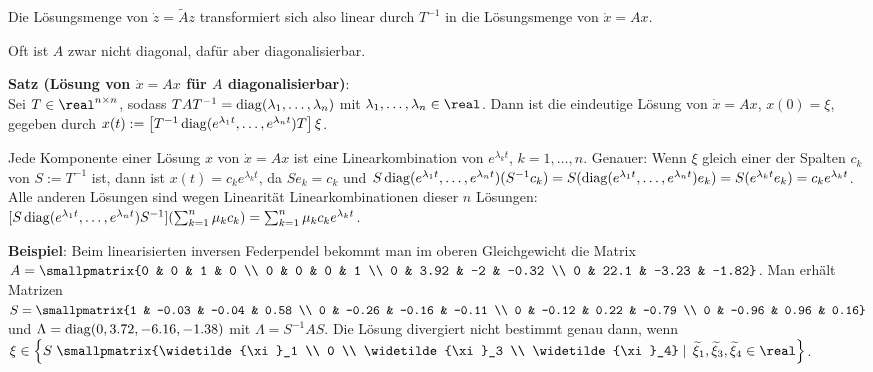 Die Lösungsmenge von $\dot{z} = \widetilde{A} z$ transformiert sich also linear durch $T^{-1}$
in die Lösungsmenge von $\dot{x} = Ax$.

\linie

Oft ist $A$ zwar nicht diagonal, dafür aber diagonalisierbar.

\textbf{Satz (Lösung von $\dot{x} = Ax$ für $A$ diagonalisierbar)}:\\
Sei $T \in \real^{n \times n}$, sodass
$TAT^{-1} = \operatorname{diag}(\lambda_1, \dotsc, \lambda_n)$
mit $\lambda_1, \dotsc, \lambda_n \in \real$.
Dann ist die eindeutige Lösung von $\dot{x} = Ax$, $x(0) = \xi$, gegeben durch
$x(t) := \left[T^{-1} \operatorname{diag}(e^{\lambda_1 t}, \dotsc, e^{\lambda_n t}) T\right] \xi$.

Jede Komponente einer Lösung $x$ von $\dot{x} = Ax$ ist eine
Linearkombination von $e^{\lambda_k t}$, $k = 1, \dotsc, n$.
Genauer: Wenn $\xi$ gleich einer der Spalten $c_k$ von $S := T^{-1}$ ist,
dann ist $x(t) = c_k e^{\lambda_k t}$,
da
$Se_k = c_k$ und
$S \operatorname{diag}(e^{\lambda_1 t}, \dotsc, e^{\lambda_n t}) (S^{-1} c_k) =
S (\operatorname{diag}(e^{\lambda_1 t}, \dotsc, e^{\lambda_n t}) e_k) = S (e^{\lambda_k t} e_k) =
c_k e^{\lambda_k t}$.\\
Alle anderen Lösungen sind wegen Linearität Linearkombinationen dieser $n$ Lösungen:\\
$[S \operatorname{diag}(e^{\lambda_1 t}, \dotsc, e^{\lambda_n t}) S^{-1}] (\sum_{k=1}^n \mu_k c_k)
= \sum_{k=1}^n \mu_k c_k e^{\lambda_k t}$.

\textbf{Beispiel}:
Beim linearisierten inversen Federpendel bekommt man im oberen Gleichgewicht die Matrix
$A = \smallpmatrix{0 & 0 & 1 & 0 \\ 0 & 0 & 0 & 1 \\
0 & 3.92 & -2 & -0.32 \\ 0 & 22.1 & -3.23 & -1.82}$.
Man erhält Matrizen
$S = \smallpmatrix{1 & -0.03 & -0.04 & 0.58 \\ 0 & -0.26 & -0.16 & -0.11 \\
0 & -0.12 & 0.22 & -0.79 \\ 0 & -0.96 & 0.96 & 0.16}$ und
$\Lambda = \operatorname{diag}(0, 3.72, -6.16, -1.38)$ mit $\Lambda = S^{-1} AS$.
Die Lösung divergiert nicht bestimmt genau dann, wenn
$\xi \in \left\{S \left.\smallpmatrix{\widetilde{\xi}_1 \\ 0 \\
\widetilde{\xi}_3 \\ \widetilde{\xi}_4} \;\right|\;
\widetilde{\xi}_1, \widetilde{\xi}_3, \widetilde{\xi}_4 \in \real\right\}$.

